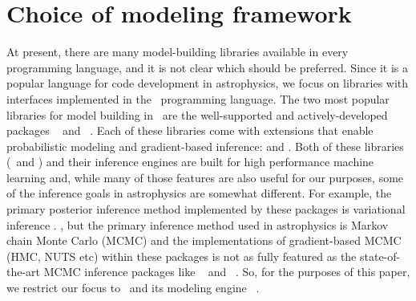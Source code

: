 \documentclass[modern]{aastex62}
\begin{document}

\section{Choice of modeling framework}

At present, there are many model-building libraries available in every programming language, and it is not clear which should be preferred.
Since it is a popular language for code development in astrophysics, we focus on libraries with interfaces implemented in the \python\ programming language.
The two most popular libraries for model building in \python\ are the well-supported and actively-developed packages \tensorflow\ \citep{Abadi:2016} and \pytorch\ \citep{Paszke:2017}.
Each of these libraries come with extensions that enable probabilistic modeling and gradient-based inference:  \citep{Dillon:2017} and  \citep{Bingham:2018}.
Both of these libraries (\tensorflow\ and \pytorch) and their inference engines are built for high performance machine learning and, while many of those features are also useful for our purposes, some of the inference goals in astrophysics are somewhat different.
For example, the primary posterior inference method implemented by these packages is variational inference .
, but the primary inference method used in astrophysics is Markov chain Monte Carlo (MCMC) and the implementations of gradient-based MCMC (HMC, NUTS etc) within these packages is not as fully featured as the state-of-the-art MCMC inference packages like \pymc\ \citep{Salvatier:2016} and \stan\ \citep{Carpenter:2015, Carpenter:2017}.
So, for the purposes of this paper, we restrict our focus to \pymc\ and its modeling engine \theano\ \citep{Theano-Development-Team:2016}.
\end{document}
